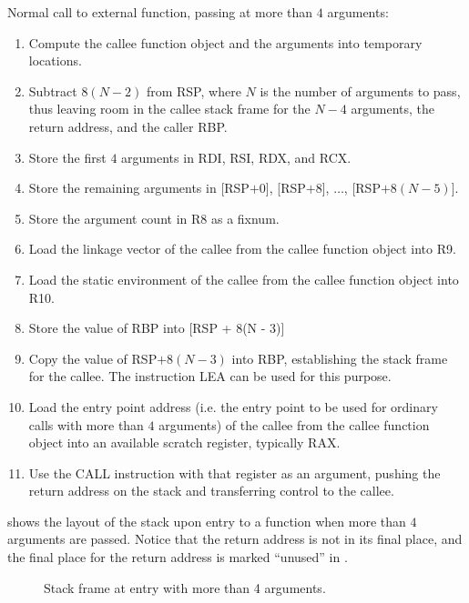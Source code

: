 Normal call to external function, passing at more than $4$ arguments:

\begin{enumerate}
\item Compute the callee function object and the arguments into
  temporary locations.
\item Subtract $8(N - 2)$ from RSP, where $N$ is the number of
  arguments to pass, thus leaving room in the callee stack frame for
  the $N - 4$ arguments, the return address, and the caller RBP. 
\item Store the first $4$ arguments in RDI, RSI, RDX, and RCX.
\item Store the remaining arguments in [RSP$ + 0$], [RSP$ + 8$],
  $\ldots$, [RSP$ + 8(N - 5)$].
\item Store the argument count in R8 as a fixnum.
\item Load the linkage vector of the callee from the callee
  function object into R9.
\item Load the static environment of the callee from the callee
  function object into R10.
\item Store the value of RBP into [RSP + 8(N - 3)]
\item Copy the value of RSP$ + 8(N - 3)$ into RBP, establishing the
  stack frame for the callee.  The instruction LEA can be used for
  this purpose.
\item Load the entry point address (i.e. the entry point to be used
  for ordinary calls with more than $4$ arguments) of the callee from
  the callee function object into an available scratch register,
  typically RAX.
\item Use the CALL instruction with that register as an argument,
  pushing the return address on the stack and transferring control to
  the callee.
\end{enumerate}

 shows the layout of the stack
upon entry to a function when more than $4$ arguments are passed.
Notice that the return address is not in its final place, and the
final place for the return address is marked ``unused'' in
.

\begin{figure}
\begin{center}
\end{center}
\caption{\label{fig-x86-64-stack-frame-at-entry}
Stack frame at entry with more than 4 arguments.}
\end{figure}

